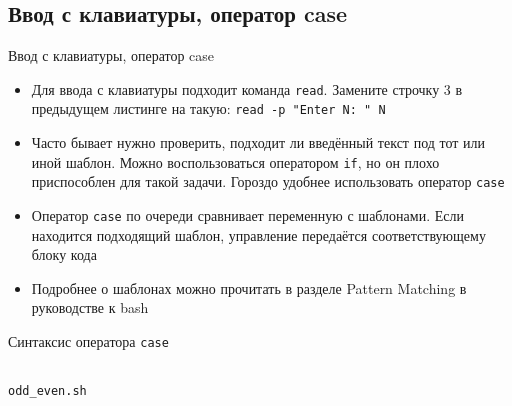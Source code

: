 \documentclass[handout]{beamer}
\begin{document}
\subsection{Ввод с клавиатуры, оператор case}
\begin{frame}{Ввод с клавиатуры, оператор case}
	\begin{itemize}
		\item{Для ввода с клавиатуры подходит команда \texttt{read}. Замените строчку 3 в предыдущем листинге на такую: \texttt{read~-p~"Enter~N: "{} N}}\pause
		\item{Часто бывает нужно проверить, подходит ли введённый текст под тот или иной шаблон. Можно воспользоваться оператором \texttt{if}, но он плохо приспособлен для такой задачи. Гороздо удобнее использовать оператор \texttt{case}}\pause
		\item{Оператор \texttt{case} по очереди сравнивает переменную с шаблонами. Если находится подходящий шаблон, управление передаётся соответствующему блоку кода}\pause
		\item{Подробнее о шаблонах можно прочитать в разделе Pattern Matching в руководстве к bash}
	\end{itemize}
\end{frame}

\begin{frame}
	\begin{minipage}{0,325\textwidth}
		Синтаксис оператора \texttt{case}
		\inputminted[linenos,fontsize=\tiny,bgcolor=listing]{bash}{files/unix_quickstart/case.sh}
	\end{minipage}
	\begin{minipage}{0,125\textwidth}
	\end{minipage}
	\begin{minipage}{0,525\textwidth}
		\texttt{odd\_even.sh}
		\inputminted[linenos,fontsize=\tiny,bgcolor=listing]{bash}{files/unix_quickstart/odd_even.sh}
	\end{minipage}
\end{frame}
\end{document}
